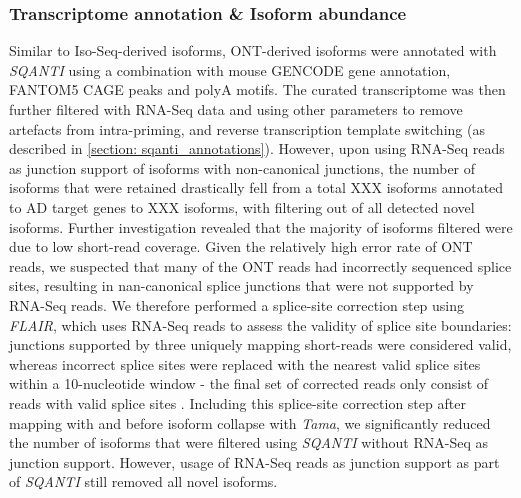 
\subsubsection{Transcriptome annotation \& Isoform abundance } 

Similar to Iso-Seq-derived isoforms, ONT-derived isoforms were annotated with \textit{SQANTI} using a combination with mouse GENCODE gene annotation, FANTOM5 CAGE peaks and polyA motifs. The curated transcriptome was then further filtered with RNA-Seq data and using other parameters to remove artefacts from intra-priming, and reverse transcription template switching (as described in \cref{section: sqanti_annotations}). However, upon using RNA-Seq reads as junction support of isoforms with non-canonical junctions, the number of isoforms that were retained drastically fell from a total XXX isoforms annotated to AD target genes to XXX isoforms, with filtering out of all detected novel isoforms. Further investigation revealed that the majority of isoforms filtered were due to low short-read coverage. Given the relatively high error rate of ONT reads, we suspected that many of the ONT reads had incorrectly sequenced splice sites, resulting in nan-canonical splice junctions that were not supported by RNA-Seq reads. We therefore performed a splice-site correction step using \textit{FLAIR}\cite{Tang2020}, which uses RNA-Seq reads to assess the validity of splice site boundaries: junctions supported by three uniquely mapping short-reads were considered valid, whereas incorrect splice sites were replaced with the nearest valid splice sites within a 10-nucleotide window - the final set of corrected reads only consist of reads with valid splice sites \cite{Tang2020}. Including this splice-site correction step after mapping with  and before isoform collapse with \textit{Tama}, we significantly reduced the number of isoforms that were filtered using \textit{SQANTI} without RNA-Seq as junction support. However, usage of RNA-Seq reads as junction support as part of \textit{SQANTI} still removed all novel isoforms.  

